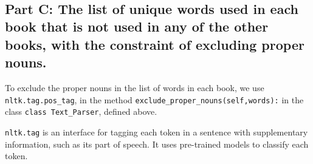 \documentclass[11pt]{article}
\begin{document}
    \begin{center}
    \end{center}
    { \hspace*{\fill} \\}
    
    \hypertarget{part-c-the-list-of-unique-words-used-in-each-book-that-is-not-used-in-any-of-the-other-books-with-the-constraint-of-excluding-proper-nouns.}{%
\subsection{Part C: The list of unique words used in each book that is
not used in any of the other books, with the constraint of excluding
proper
nouns.}\label{part-c-the-list-of-unique-words-used-in-each-book-that-is-not-used-in-any-of-the-other-books-with-the-constraint-of-excluding-proper-nouns.}}

    To exclude the proper nouns in the list of words in each book, we use
\texttt{nltk.tag.pos\_tag}, in the method
\texttt{exclude\_proper\_nouns(self,words):} in the class
\texttt{class\ Text\_Parser}, defined above.

\texttt{nltk.tag} is an interface for tagging each token in a sentence
with supplementary information, such as its part of speech. It uses
pre-trained models to classify each token. 
\end{document}
